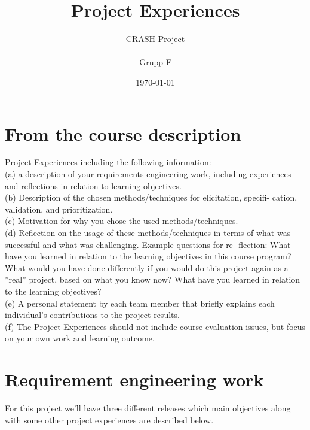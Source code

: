 \documentclass[10pt]{article}
\title{Project Experiences}
\author{CRASH Project
\\
\\ Grupp F}
\date{}
\begin{document}
\date{\today}
\begin{titlepage}
\clearpage
  \maketitle
\thispagestyle{empty}

\end{titlepage}


\tableofcontents
\thispagestyle{empty}
\newpage
{}

\section{From the course description}
\sloppy
\noindent
Project Experiences including the following information:
\\(a) a description of your requirements engineering work, including experiences
and reflections in relation to learning objectives.
\\(b) Description of the chosen methods/techniques for elicitation, specifi-
cation, validation, and prioritization.
\\(c) Motivation for why you chose the used methods/techniques.
\\(d) Reflection on the usage of these methods/techniques in terms of what
was successful and what was challenging. Example questions for re-
flection: What have you learned in relation to the learning objectives
in this course program? What would you have done differently if you
would do this project again as a ”real” project, based on what you know
now? What have you learned in relation to the learning objectives?
\\(e) A personal statement by each team member that briefly explains each
individual’s contributions to the project results.
\\(f) The Project Experiences should not include course evaluation issues,
but focus on your own work and learning outcome.
\newline

\section{Requirement engineering work}
\noindent For this project we'll have three different releases which main objectives along with some other project experiences are described below.
\end{document}

